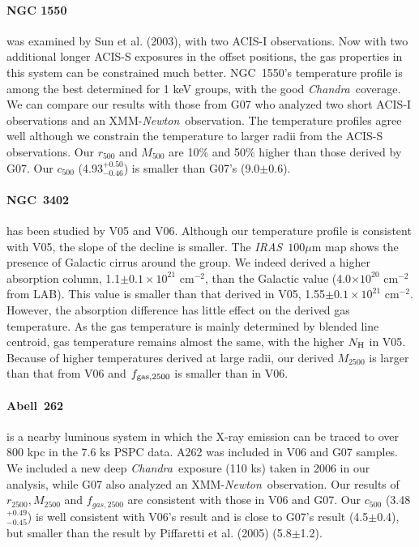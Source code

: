 \documentclass{aastex}
\def\chandra    {{\em Chandra}\/}
\def\xmm        {XMM-{\em Newton}\/}
\def\iras        {{\em IRAS}\/}
\begin{document}
\begin{appendix}
\paragraph{NGC 1550} was examined by Sun et al. (2003), with two ACIS-I observations.
Now with two additional longer ACIS-S exposures in the offset positions, the gas
properties in this system can be
constrained much better. NGC~1550's temperature profile is among the best determined
for 1 keV groups, with the good \chandra\ coverage. We can compare our results with
those from G07 who analyzed two short ACIS-I observations and an \xmm\ observation.
The temperature profiles agree well although we constrain the temperature to
larger radii from the ACIS-S observations. Our $r_{500}$ and $M_{500}$ are 10\% and
50\% higher than those derived
by G07. Our $c_{500}$ (4.93$^{+0.50}_{-0.46}$) is smaller than G07's (9.0$\pm$0.6).

\paragraph{NGC~3402} has been studied by V05 and V06. Although our temperature profile
is consistent with V05, the slope of the decline is smaller.
The \iras\ $100\mu$m map shows the presence of Galactic cirrus around the
group. We indeed derived a higher absorption column, 1.1$\pm0.1 \times 10^{21}$
cm$^{-2}$, than the Galactic value (4.0$\times10^{20}$ cm$^{-2}$ from LAB).
This value is smaller than that derived in V05, 1.55$\pm0.1 \times 10^{21}$
cm$^{-2}$. However, the absorption difference has little effect on the derived gas
temperature. As the gas temperature is mainly determined by blended line centroid,
gas temperature remains almost the same, with the higher $N_{\rm H}$ in V05.
Because of higher temperatures derived at large radii, our derived $M_{2500}$ is
larger than that from V06 and $f_{\rm gas, 2500}$ is smaller than in V06.

\paragraph{Abell~262} is a nearby luminous system in which the X-ray emission can
be traced to over 800 kpc in the 7.6 ks PSPC data. A262 was included in V06 and G07
samples. We included a new deep \chandra\ exposure (110 ks) taken in 2006 in our
analysis, while G07 also analyzed an \xmm\ observation. Our results of
$r_{2500}, M_{2500}$ and $f_{gas, 2500}$ are consistent with those in V06 and G07.
Our $c_{500}$ (3.48$^{+0.49}_{-0.45}$) is well consistent with V06's result
and is close to G07's result (4.5$\pm$0.4), but smaller than the result by
Piffaretti et al. (2005) (5.8$\pm$1.2).


\end{appendix}
\end{document}
